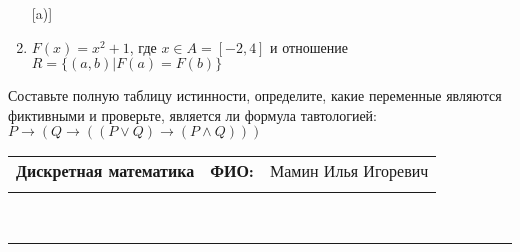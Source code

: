 \documentclass[10pt]{exam}
\newcommand{\class}{Дискретная математика}
\newcommand{\examdate}{}
\begin{document}
\begin{questions}
\begin{enumerate} [a)]
\item $F(x)=x^{2}+1$, где $x \in A = [-2, 4]$ и отношение $R = \{(a,b)|F(a) = F(b)\}$
\end{enumerate}\question Составьте полную таблицу истинности, определите, какие переменные являются фиктивными и проверьте, является ли формула тавтологией:
$ P \rightarrow (Q \rightarrow ((P \lor Q) \rightarrow (P \land Q)))$

\end{questions}
\newpage
\begin{flushright}
\begin{tabular}{p{2.8in} r l}
\textbf{\class} & \textbf{ФИО:} &Мамин Илья Игоревич
\\

\textbf{\examdate} &&\\
\end{tabular}\\
\end{flushright}
\rule[1ex]{\textwidth}{.1pt}
\end{document}
